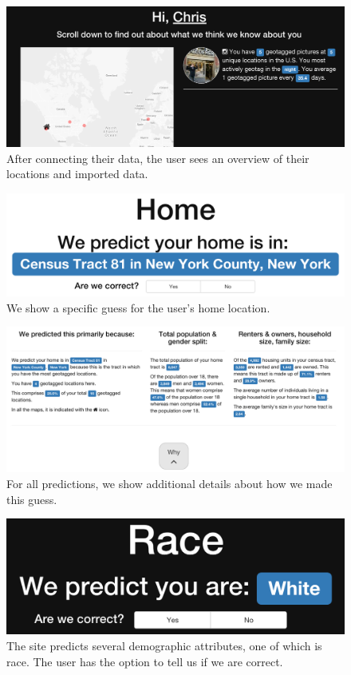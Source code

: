 \begin{figure}[h]
  \includegraphics[width=\figwidth]{fig/findyou/overview.png}
  \caption{After connecting their data, the user sees an overview of their locations and imported data.}
  \label{fig:overview}
\end{figure}

\begin{figure}[h]
  \includegraphics[width=\figwidth]{fig/findyou/home.png}
  \caption{We show a specific guess for the user's home location.}
  \label{fig:home}
\end{figure}

\begin{figure}[h]
  \includegraphics[width=\figwidth]{fig/findyou/home-detail.png}
  \caption{For all predictions, we show additional details about how we made this guess.}
  \label{fig:home-detail}
\end{figure}

\begin{figure}[h]
  \includegraphics[width=\figwidth]{fig/findyou/race.png}
  \caption{The site predicts several demographic attributes, one of which is race. The user has the option to tell us if we are correct.}
  \label{fig:race}
\end{figure}


